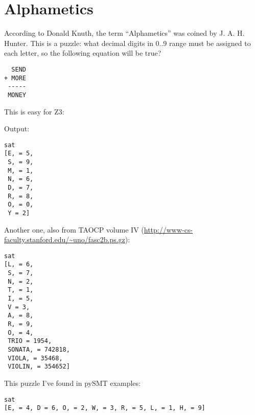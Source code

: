 \section{Alphametics}

According to Donald Knuth, the term ``Alphametics'' was coined by J. A. H. Hunter.
This is a puzzle: what decimal digits in 0..9 range must be assigned to each letter,
so the following equation will be true?

\begin{lstlisting}
  SEND
+ MORE
 -----
 MONEY
\end{lstlisting}

This is easy for Z3:



Output:

\begin{lstlisting}
sat
[E, = 5,
 S, = 9,
 M, = 1,
 N, = 6,
 D, = 7,
 R, = 8,
 O, = 0,
 Y = 2]
\end{lstlisting}

Another one, also from \ac{TAOCP} volume IV (\url{http://www-cs-faculty.stanford.edu/~uno/fasc2b.ps.gz}):



\begin{lstlisting}
sat
[L, = 6,
 S, = 7,
 N, = 2,
 T, = 1,
 I, = 5,
 V = 3,
 A, = 8,
 R, = 9,
 O, = 4,
 TRIO = 1954,
 SONATA, = 742818,
 VIOLA, = 35468,
 VIOLIN, = 354652]
\end{lstlisting}

This puzzle I've found in pySMT examples:



\begin{lstlisting}
sat
[E, = 4, D = 6, O, = 2, W, = 3, R, = 5, L, = 1, H, = 9]
\end{lstlisting}

